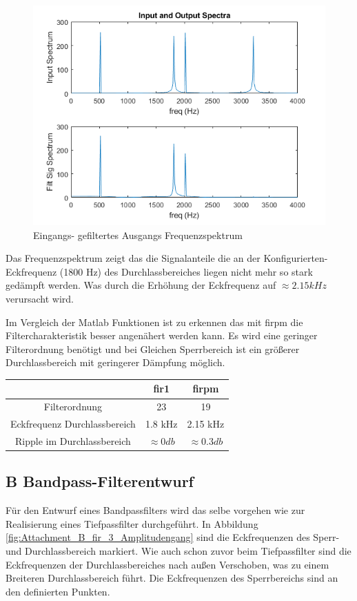 \begin{figure}[H]
\centering
\includegraphics[width=0.85\linewidth]{./Bilder/Attachment_A2_fir_2b_Spektrum}
\caption{Eingangs- gefiltertes Ausgangs Frequenzspektrum}
\label{fig:Attachment_A2_fir_2b_Spektrum}
\end{figure}

\noindent Das Frequenzspektrum zeigt das die Signalanteile die an der Konfigurierten-Eckfrequenz (1800 Hz) des Durchlassbereiches liegen nicht mehr so stark gedämpft werden. Was durch die Erhöhung der Eckfrequenz auf $\approx 2.15 kHz$ verursacht wird.


\noindent Im Vergleich der Matlab Funktionen ist zu erkennen das mit firpm die Filtercharakteristik besser angenähert werden kann. Es wird eine geringer Filterordnung benötigt und bei Gleichen Sperrbereich ist ein größerer Durchlassbereich mit geringerer Dämpfung möglich.

\begin{table}[H]
	\centering
	\begin{tabular}{c | c | c}
						& fir1	&	firpm \\
		\hline	
		Filterordnung	& 23		& 19	\\
		Eckfrequenz Durchlassbereich	& 1.8 kHz	& 2.15 kHz\\ 
		Ripple im Durchlassbereich		& $\approx 0 db$	& $\approx 0.3 db$
	\end{tabular}
\end{table}

\clearpage

\subsection{B Bandpass-Filterentwurf}
\noindent Für den Entwurf eines Bandpassfilters wird das selbe vorgehen wie zur Realisierung eines Tiefpassfilter durchgeführt. In Abbildung \ref{fig:Attachment_B_fir_3_Amplitudengang} sind die Eckfrequenzen des Sperr- und Durchlassbereich markiert. Wie auch schon zuvor beim Tiefpassfilter sind die Eckfrequenzen der Durchlassbereiches nach außen Verschoben, was zu einem Breiteren Durchlassbereich führt. Die Eckfrequenzen des Sperrbereichs sind an den definierten Punkten.

